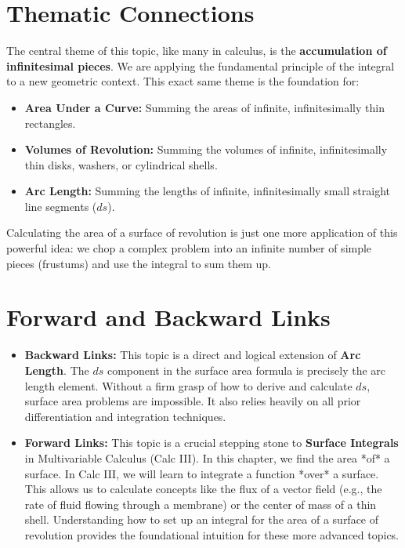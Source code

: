 \documentclass{article}
\begin{document}
\section{Thematic Connections}
The central theme of this topic, like many in calculus, is the \textbf{accumulation of infinitesimal pieces}. We are applying the fundamental principle of the integral to a new geometric context. This exact same theme is the foundation for:
\begin{itemize}
    \item \textbf{Area Under a Curve:} Summing the areas of infinite, infinitesimally thin rectangles.
    \item \textbf{Volumes of Revolution:} Summing the volumes of infinite, infinitesimally thin disks, washers, or cylindrical shells.
    \item \textbf{Arc Length:} Summing the lengths of infinite, infinitesimally small straight line segments (\(ds\)).
\end{itemize}
Calculating the area of a surface of revolution is just one more application of this powerful idea: we chop a complex problem into an infinite number of simple pieces (frustums) and use the integral to sum them up.

\section{Forward and Backward Links}
\begin{itemize}
    \item \textbf{Backward Links:} This topic is a direct and logical extension of \textbf{Arc Length}. The \(ds\) component in the surface area formula is precisely the arc length element. Without a firm grasp of how to derive and calculate \(ds\), surface area problems are impossible. It also relies heavily on all prior differentiation and integration techniques.
    \item \textbf{Forward Links:} This topic is a crucial stepping stone to \textbf{Surface Integrals} in Multivariable Calculus (Calc III). In this chapter, we find the area *of* a surface. In Calc III, we will learn to integrate a function *over* a surface. This allows us to calculate concepts like the flux of a vector field (e.g., the rate of fluid flowing through a membrane) or the center of mass of a thin shell. Understanding how to set up an integral for the area of a surface of revolution provides the foundational intuition for these more advanced topics.
\end{itemize}
\end{document}
